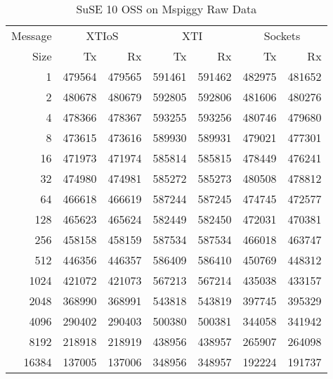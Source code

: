 \documentclass[letterpaper,final,notitlepage,twocolumn,10pt,twoside]{article}
\let\normalsize\small
\let\small\footnotesize
\let\footnotesize\scriptsize
\let\scriptsize\tiny
\begin{document}
\begin{appendix}
\begin{table}[hbp]
\normalsize
\begin{center}
\setlength{\tabcolsep}{0.3em}
\setlength{\arraycolsep}{0.3em}
\begin{tabular}{rrrrrrr}\\
Message & \multicolumn{2}{c}{XTIoS} & \multicolumn{2}{c}{XTI} & \multicolumn{2}{c}{Sockets}\\
Size & Tx & Rx & Tx & Rx & Tx & Rx\\
\hline
\hline
1 & 479564 & 479565 & 591461 & 591462 & 482975 & 481652\\
2 & 480678 & 480679 & 592805 & 592806 & 481606 & 480276\\
4 & 478366 & 478367 & 593255 & 593256 & 480746 & 479680\\
8 & 473615 & 473616 & 589930 & 589931 & 479021 & 477301\\
16 & 471973 & 471974 & 585814 & 585815 & 478449 & 476241\\
32 & 474980 & 474981 & 585272 & 585273 & 480508 & 478812\\
64 & 466618 & 466619 & 587244 & 587245 & 474745 & 472577\\
128 & 465623 & 465624 & 582449 & 582450 & 472031 & 470381\\
256 & 458158 & 458159 & 587534 & 587534 & 466018 & 463747\\
512 & 446356 & 446357 & 586409 & 586410 & 450769 & 448312\\
1024 & 421072 & 421073 & 567213 & 567214 & 435038 & 433157\\
2048 & 368990 & 368991 & 543818 & 543819 & 397745 & 395329\\
4096 & 290402 & 290403 & 500380 & 500381 & 344058 & 341942\\
8192 & 218918 & 218919 & 438956 & 438957 & 265907 & 264098\\
16384 & 137005 & 137006 & 348956 & 348957 & 192224 & 191737\\
\hline
\end{tabular}
\end{center}
\normalsize
\caption[SuSE 10 OSS on Mspiggy Raw Data]{SuSE 10 OSS on Mspiggy Raw Data}
\label{table:nbdata}
\end{table}

\end{appendix}
\end{document}

